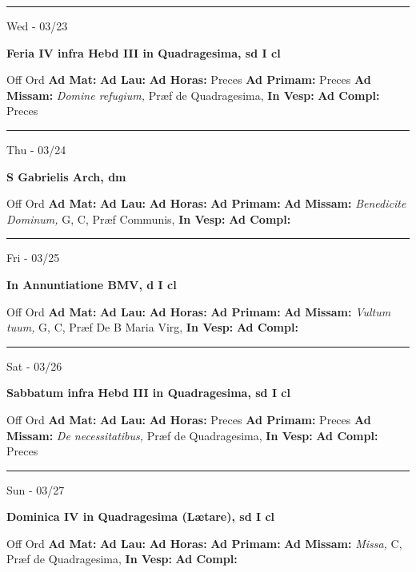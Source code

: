 \documentclass[letterpaper, 10pt]{article}
\begin{document}
\hrule
\begin{center}
Wed - 03/23
\end{center}\textbf{ \large Feria IV infra Hebd III in Quadragesima, \textnormal{\normalsize sd I cl}}
\begin{justify}
Off Ord
\textbf{Ad Mat: }
\textbf{Ad Lau: }
\textbf{Ad Horas: }Preces
\textbf{Ad Primam: }Preces
\textbf{Ad Missam:} \textit{Domine refugium, } Præf de Quadragesima, 
\textbf{In Vesp: }
\textbf{Ad Compl: }Preces\end{justify}



\hrule
\begin{center}
Thu - 03/24
\end{center}\textbf{ \large S Gabrielis Arch, \textnormal{\normalsize dm}}
\begin{justify}
Off Ord
\textbf{Ad Mat: }
\textbf{Ad Lau: }
\textbf{Ad Horas: }
\textbf{Ad Primam: }
\textbf{Ad Missam:} \textit{Benedicite Dominum, } G, C, Præf Communis, 
\textbf{In Vesp: }
\textbf{Ad Compl: }\end{justify}



\hrule
\begin{center}
Fri - 03/25
\end{center}\textbf{ \large In Annuntiatione BMV, \textnormal{\normalsize d I cl}}
\begin{justify}
Off Ord
\textbf{Ad Mat: }
\textbf{Ad Lau: }
\textbf{Ad Horas: }
\textbf{Ad Primam: }
\textbf{Ad Missam:} \textit{Vultum tuum, } G, C, Præf De B Maria Virg, 
\textbf{In Vesp: }
\textbf{Ad Compl: }\end{justify}



\hrule
\begin{center}
Sat - 03/26
\end{center}\textbf{ \large Sabbatum infra Hebd III in Quadragesima, \textnormal{\normalsize sd I cl}}
\begin{justify}
Off Ord
\textbf{Ad Mat: }
\textbf{Ad Lau: }
\textbf{Ad Horas: }Preces
\textbf{Ad Primam: }Preces
\textbf{Ad Missam:} \textit{De necessitatibus, } Præf de Quadragesima, 
\textbf{In Vesp: }
\textbf{Ad Compl: }Preces\end{justify}



\hrule
\begin{center}
Sun - 03/27
\end{center}\textbf{ \large Dominica IV in Quadragesima (Lætare), \textnormal{\normalsize sd I cl}}
\begin{justify}
Off Ord
\textbf{Ad Mat: }
\textbf{Ad Lau: }
\textbf{Ad Horas: }
\textbf{Ad Primam: }
\textbf{Ad Missam:} \textit{Missa, } C, Præf de Quadragesima, 
\textbf{In Vesp: }
\textbf{Ad Compl: }\end{justify}
\end{document}

